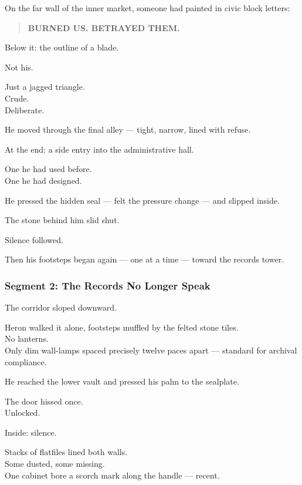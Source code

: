 \documentclass[9pt]{article}
\begin{document}
On the far wall of the inner market, someone had painted in civic block letters:

\begin{quote}
\textbf{BURNED US. BETRAYED THEM.}
\end{quote}

Below it: the outline of a blade.

Not his.

Just a jagged triangle.\\
Crude.\\
Deliberate.

\vspace{1em}

He moved through the final alley — tight, narrow, lined with refuse.

At the end: a side entry into the administrative hall.

One he had used before.\\
One he had designed.

He pressed the hidden seal — felt the pressure change — and slipped inside.

\vspace{1em}

The stone behind him slid shut.

Silence followed.

Then his footsteps began again — one at a time — toward the records tower.

\newpage

\subsubsection*{Segment 2: The Records No Longer Speak}

The corridor sloped downward.

Heron walked it alone, footsteps muffled by the felted stone tiles.\\
No lanterns.\\
Only dim wall-lamps spaced precisely twelve paces apart — standard for archival compliance.

He reached the lower vault and pressed his palm to the sealplate.

The door hissed once.\\
Unlocked.

\vspace{1em}

Inside: silence.

Stacks of flatfiles lined both walls.\\
Some dusted, some missing.\\
One cabinet bore a scorch mark along the handle — recent.
\end{document}
